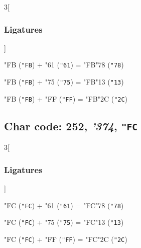 \documentclass{article}
\newlength{\maxcharwidth}
\begin{document}
\begin{multicols}{3}[\subsubsection{Ligatures}]

{\testfont\char"FB\noboundary} ({\tt"FB}) + {\testfont\char"61\noboundary} ({\tt"61}) = {\testfont\char"FB\noboundary}{\testfont\char"78\noboundary} ({\tt"78}) 

{\testfont\char"FB\noboundary} ({\tt"FB}) + {\testfont\char"75\noboundary} ({\tt"75}) = {\testfont\char"FB\noboundary}{\testfont\char"13\noboundary} ({\tt"13}) 

{\testfont\char"FB\noboundary} ({\tt"FB}) + {\testfont\char"FF\noboundary} ({\tt"FF}) = {\testfont\char"FB\noboundary}{\testfont\char"2C\noboundary} ({\tt"2C}) 

\end{multicols}

\subsection{Char code: 252, {\it'374}, {\tt"FC}}
\label{char_252}


\begin{multicols}{3}[\subsubsection{Ligatures}]

{\testfont\char"FC\noboundary} ({\tt"FC}) + {\testfont\char"61\noboundary} ({\tt"61}) = {\testfont\char"FC\noboundary}{\testfont\char"78\noboundary} ({\tt"78}) 

{\testfont\char"FC\noboundary} ({\tt"FC}) + {\testfont\char"75\noboundary} ({\tt"75}) = {\testfont\char"FC\noboundary}{\testfont\char"13\noboundary} ({\tt"13}) 

{\testfont\char"FC\noboundary} ({\tt"FC}) + {\testfont\char"FF\noboundary} ({\tt"FF}) = {\testfont\char"FC\noboundary}{\testfont\char"2C\noboundary} ({\tt"2C}) 

\end{multicols}
\end{document}
